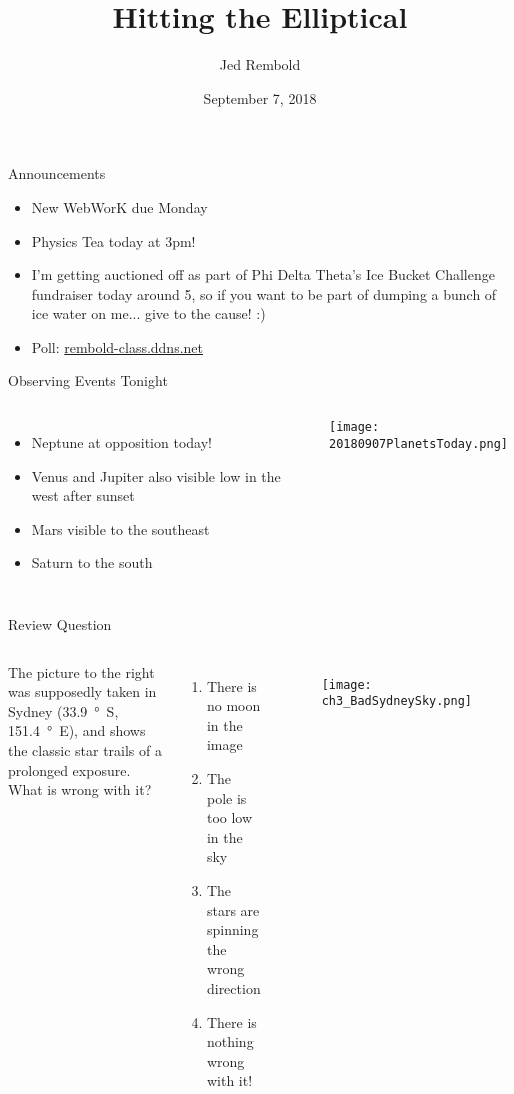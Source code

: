 \documentclass[pdf, aspectratio=169]{beamer}
\title{Hitting the Elliptical}
\date{September 7, 2018}
\author{Jed Rembold}
\begin{document}
\renewcommand*{\theenumi}{\Alph{enumi}}

\begin{frame}{Announcements}
	\begin{itemize}
	  \item New WebWorK due Monday
	  \item Physics Tea today at 3pm!
	  \item I'm getting auctioned off as part of Phi Delta Theta's Ice Bucket Challenge fundraiser today around 5, so if you want to be part of dumping a bunch of ice water on me... give to the cause! :)
	  \item Poll: \url{rembold-class.ddns.net}
	\end{itemize}
\end{frame}

\begin{frame}{Observing Events Tonight}
	\begin{columns}
		\begin{itemize}
			\item Neptune at opposition today!
			\item Venus and Jupiter also visible low in the west after sunset
			\item Mars visible to the southeast
			\item Saturn to the south
		\end{itemize}
		
		\begin{center}
			\texttt{[image: 20180907PlanetsToday.png]}
		\end{center}
		
	\end{columns}
\end{frame}

\begin{frame}{Review Question}
  \begin{columns}
	\column{.5\textwidth}
	The picture to the right was supposedly taken in Sydney (\SI{33.9}{\degree S}, \SI{151.4}{\degree E}), and shows the classic star trails of a prolonged exposure. What is wrong with it?
	\begin{enumerate}
	  \item There is no moon in the image
	  \item \alert<2>{The pole is too low in the sky}
	  \item The stars are spinning the wrong direction
	  \item There is nothing wrong with it!
	\end{enumerate}
	\column{.5\textwidth}
	\begin{figure}[h!]
	  \centering
	  \texttt{[image: ch3\_BadSydneySky.png]}
	\end{figure}
  \end{columns}
\end{frame}
\end{document}
